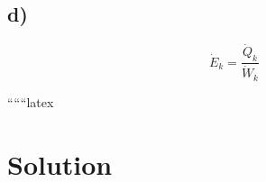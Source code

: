 

\subsection*{d)}

\begin{equation}
\dot{E}_{k} = \frac{\dot{Q}_{k}}{\dot{W}_{k}}
\end{equation}

``````latex


\section*{Solution}